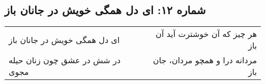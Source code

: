 \begin{center}
\section*{شماره ۱۲: ای دل همگی خویش در جانان باز}
\label{sec:012}
\begin{longtable}{l p{0.5cm} r}
ای دل همگی خویش در جانان باز
&&
هر چیز که آن خوشترت آید آن باز
\\
در شش در عشق چون زنان حیله مجوی
&&
مردانه درا و همچو مردان، جان باز
\\
\end{longtable}
\end{center}
